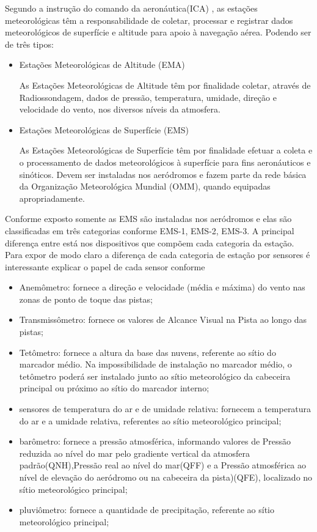 Segundo a instrução do comando da aeronáutica(ICA) \cite{BRASILMCA104}, as estações meteorológicas têm a responsabilidade de coletar, processar e registrar dados meteorológicos de superfície e altitude para apoio à navegação aérea. Podendo ser de três tipos:
\begin{itemize}
    \item Estações Meteorológicas de Altitude (EMA)
    \begin{citacao}
As Estações Meteorológicas de Altitude têm por finalidade coletar, através de Radiossondagem, dados de pressão, temperatura, umidade, direção e velocidade do vento, nos diversos níveis da atmosfera. 
    \end{citacao}
    \item Estações Meteorológicas de Superfície (EMS)
    \begin{citacao}
As Estações Meteorológicas de Superfície têm por finalidade efetuar a coleta e o processamento de dados meteorológicos à superfície para fins aeronáuticos e sinóticos. Devem ser instaladas nos aeródromos e fazem parte da rede básica da Organização Meteorológica Mundial (OMM), quando equipadas apropriadamente.
\end{citacao}

\end{itemize}

Conforme exposto somente as EMS são instaladas nos aeródromos e elas são classificadas em três categorias conforme \cite{BRASILMCA104} EMS-1, EMS-2, EMS-3. A principal diferença entre está nos dispositivos que compõem cada categoria da estação. Para expor de modo claro a diferença de cada categoria de estação por sensores é interessante explicar o papel de cada sensor conforme \cite{DECEA}

\begin{itemize}
    \item Anemômetro: fornece a direção e velocidade (média e máxima) do vento nas zonas de ponto de toque das pistas; 
    \item Transmissômetro: fornece os valores de Alcance Visual na Pista ao longo das pistas;
    \item Tetômetro: fornece a altura da base das nuvens, referente ao sítio do marcador médio. Na impossibilidade de instalação no marcador médio, o tetômetro poderá ser instalado junto ao sítio meteorológico da cabeceira principal ou próximo ao sítio do marcador interno; 
    \item sensores de temperatura do ar e de umidade relativa: fornecem a temperatura do ar e a umidade relativa, referentes ao sítio meteorológico principal;
    \item barômetro: fornece a pressão atmosférica, informando valores de Pressão reduzida ao nível do mar pelo gradiente vertical da atmosfera padrão(QNH),Pressão real ao nível do mar(QFF) e a Pressão atmosférica ao nível de elevação do aeródromo ou na cabeceira da pista)(QFE), localizado no sítio meteorológico principal; 
    \item pluviômetro: fornece a quantidade de precipitação, referente ao sítio meteorológico principal;
\end{itemize}

